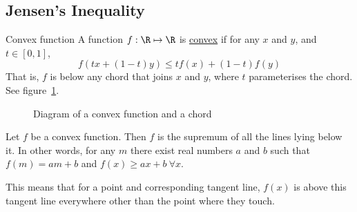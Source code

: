 \documentclass[../Main.tex]{subfiles}
\begin{document}
\subsection{Jensen's Inequality}
\begin{definition}{Convex function}
    A function $f : \R \mapsto \R$ is \underline{convex} if for any $x$ and $y$, and $t \in [0, 1]$,
    \begin{equation*}
        f(tx + (1-t)y) \leq tf(x) + (1-t) f(y)
    \end{equation*}
    That is, $f$ is below any chord that joins $x$ and $y$, where $t$ parameterises the chord. See figure~\ref{figConvexCurve}.
\end{definition}
\begin{figure}[ht]
    \centering
    \caption{Diagram of a convex function and a chord}
    \label{figConvexCurve}
\end{figure}
\begin{lemma}
    Let $f$ be a convex function. Then $f$ is the supremum of all the lines lying below it. In other words, for any $m$ there exist real numbers $a$ and $b$ such that $f(m) = am+b$ and $f(x) \geq ax + b~\forall x$.
    \label{lemTangentBelowConvex}
\end{lemma}
This means that for a point and corresponding tangent line, $f(x)$ is above this tangent line everywhere other than the point where they touch.
\end{document}

